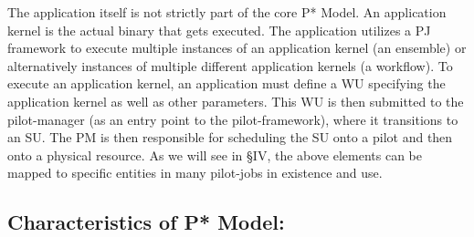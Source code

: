 \documentclass[conference,final]{IEEEtran}
\newcommand{\jhanote}[1]{ {\textcolor{red} { ***shantenu: #1 }}}
\newcommand{\jhanote}[1]{}
\newcommand{\upp}{\vspace*{-0.5em}}
\begin{document}
The application itself is not strictly part of the core P* Model. %
An application kernel is the actual binary that gets executed.  The
application utilizes a PJ framework to execute multiple instances of
an application kernel (an ensemble) or alternatively instances of
multiple different application kernels (a workflow).  To execute an
application kernel, an application must define a WU specifying the
application kernel as well as other parameters. This WU is then
submitted to the pilot-manager (as an entry point to the
pilot-framework), where it transitions to an SU. The PM is then
responsible for scheduling the SU onto a pilot and then onto a
physical resource.  As we will see in \S{IV}, the above elements can
be mapped to specific entities in many pilot-jobs in existence and
use.

% 
% 


\subsection{Characteristics of P* Model:\upp\upp}
\label{sec:p_star_elements}


 
\end{document}
